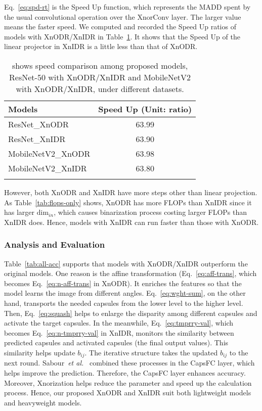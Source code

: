 \documentclass[sn-mathphys,iicol,Numbered]{sn-jnl}
\newcommand{\etal}{\textit{et al.}}
\begin{document}
Eq.~\ref{eq:spd-rt} is the Speed Up function, which represents the MADD spent by the usual convolutional operation over the XnorConv layer. The larger value means the faster speed. We computed and recorded the Speed Up ratios of models with XnODR/XnIDR in Table~\ref{tab:speed-up}. It shows that the Speed Up of the linear projector in XnIDR is a little less than that of XnODR.

\begin{table}[ht]
\caption{shows speed comparison among proposed models, ResNet-50 with XnODR/XnIDR and MobileNetV2 with XnODR/XnIDR, under different datasets.}
\begin{tabular}{l|c}
\toprule
Models & Speed Up (Unit: ratio) \\
\midrule
ResNet\_XnODR & 63.99 \\
ResNet\_XnIDR & 63.90 \\
MobileNetV2\_XnODR & 63.98 \\
MobileNetV2\_XnIDR & 63.80 \\ 
\botrule
\end{tabular} \label{tab:speed-up}
\end{table}

However, both XnODR and XnIDR have more steps other than linear projection. As Table~\ref{tab:flops-only} shows, XnODR has more FLOPs than XnIDR since it has larger $\text{dim}_{in}$, which causes binarization process costing larger FLOPs than XnIDR does. Hence, models with XnIDR can run faster than those with XnODR.

\subsubsection{Analysis and Evaluation} \label{sec:4.4.4}

Table~\ref{tab:all-acc} supports that models with XnODR/XnIDR outperform the original models. One reason is the affine transformation (Eq.~\ref{eq:aff-trans}, which becomes Eq.~\ref{eq:n-aff-trans} in XnODR). It enriches the features so that the model learns the image from different angles. Eq.~\ref{eq:wght-sum}, on the other hand, transports the needed capsules from the lower level to the higher level. Then, Eq.~\ref{eq:squash} helps to enlarge the disparity among different capsules and activate the target capsules. In the meanwhile, Eq.~\ref{eq:tmprry-val}, which becomes Eq.~\ref{eq:n-tmprry-val} in XnIDR, monitors the similarity between predicted capsules and activated capsules (the final output values). This similarity helps update $b_{ij}$. The iterative structure takes the updated $b_{ij}$ to the next round. Sabour~\etal~\cite{A1_caps} combined these processes in the CapsFC layer, which helps improve the prediction. Therefore, the CapsFC layer enhances accuracy. Moreover, Xnorization helps reduce the parameter and speed up the calculation process. Hence, our proposed XnODR and XnIDR suit both lightweight models and heavyweight models.
\end{document}
